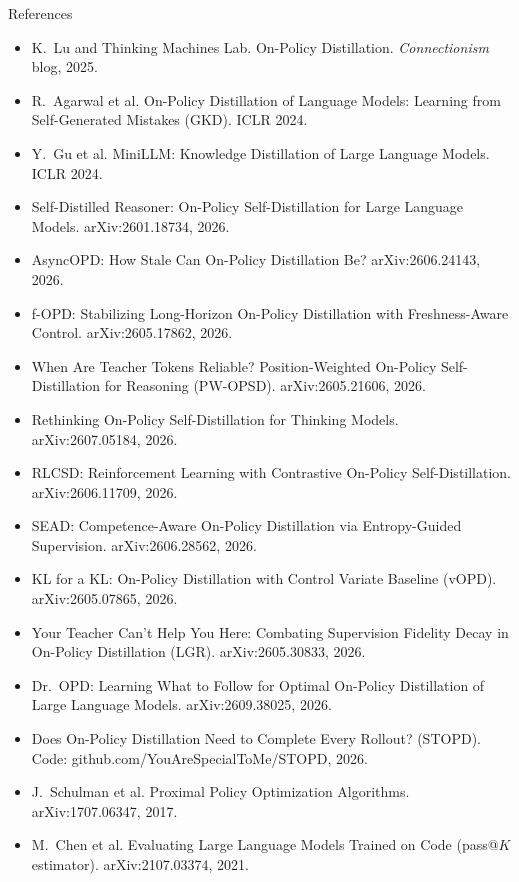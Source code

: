\documentclass[aspectratio=169,11pt]{beamer}
\begin{document}
\begin{frame}[allowframebreaks]{References}
\footnotesize
\begin{itemize}
  \item K.~Lu and Thinking Machines Lab. On-Policy Distillation. \emph{Connectionism} blog, 2025.
  \item R.~Agarwal et al. On-Policy Distillation of Language Models: Learning from Self-Generated Mistakes (GKD). ICLR 2024.
  \item Y.~Gu et al. MiniLLM: Knowledge Distillation of Large Language Models. ICLR 2024.
  \item Self-Distilled Reasoner: On-Policy Self-Distillation for Large Language Models. arXiv:2601.18734, 2026.
  \item AsyncOPD: How Stale Can On-Policy Distillation Be? arXiv:2606.24143, 2026.
  \item f-OPD: Stabilizing Long-Horizon On-Policy Distillation with Freshness-Aware Control. arXiv:2605.17862, 2026.
  \item When Are Teacher Tokens Reliable? Position-Weighted On-Policy Self-Distillation for Reasoning (PW-OPSD). arXiv:2605.21606, 2026.
  \item Rethinking On-Policy Self-Distillation for Thinking Models. arXiv:2607.05184, 2026.
  \item RLCSD: Reinforcement Learning with Contrastive On-Policy Self-Distillation. arXiv:2606.11709, 2026.
  \item SEAD: Competence-Aware On-Policy Distillation via Entropy-Guided Supervision. arXiv:2606.28562, 2026.
  \item KL for a KL: On-Policy Distillation with Control Variate Baseline (vOPD). arXiv:2605.07865, 2026.
  \item Your Teacher Can't Help You Here: Combating Supervision Fidelity Decay in On-Policy Distillation (LGR). arXiv:2605.30833, 2026.
  \item Dr.\ OPD: Learning What to Follow for Optimal On-Policy Distillation of Large Language Models. arXiv:2609.38025, 2026.
  \item Does On-Policy Distillation Need to Complete Every Rollout? (STOPD). Code: github.com/YouAreSpecialToMe/STOPD, 2026.
  \item J.~Schulman et al. Proximal Policy Optimization Algorithms. arXiv:1707.06347, 2017.
  \item M.~Chen et al. Evaluating Large Language Models Trained on Code (pass@$K$ estimator). arXiv:2107.03374, 2021.

\end{itemize}
\end{frame}
\end{document}
